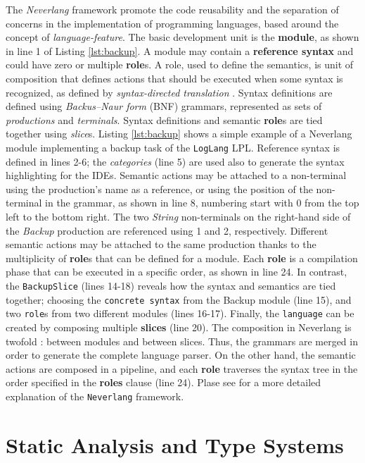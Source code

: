 The \textit{Neverlang} \cite{Cazzola12c, Cazzola13e, Cazzola15c} framework promote the code reusability and the separation of concerns in the implementation of programming languages, based around the concept of \textit{language-feature}.
The basic development unit is the \textbf{module}, as shown in line 1 of Listing \ref{lst:backup}.
A module may contain a \textbf{reference syntax} and could have zero or multiple \textbf{role}s. A role, used to define the semantics, is unit of composition that defines actions that should be executed when some syntax is recognized, as defined by \textit{syntax-directed translation} \cite{Aho86}.
Syntax definitions are defined using \textit{Backus–Naur form} (BNF) grammars, represented as sets of \textit{productions} and \textit{terminals}.
Syntax definitions and semantic \textbf{role}s are tied together using \textit{slice}s.
Listing \ref{lst:backup} shows a simple example of a Neverlang module implementing a backup task of the \texttt{LogLang} LPL. Reference syntax is defined in lines 2-6; the \textit{categories} (line 5) are used also to generate the syntax highlighting for the IDEs.
Semantic actions may be attached to a non-terminal using the production's name as a reference, or using the position of the non-terminal in the grammar, as shown in line 8, numbering start with 0 from the top left to the bottom right.
The two \textit{String} non-terminals on the right-hand side of the \textit{Backup} production are referenced using 1 and 2, respectively.
Different semantic actions may be attached to the same production thanks to the multiplicity of \textbf{role}s that can be defined for a module. Each \textbf{role} is a compilation phase that can be executed in a specific order, as shown in line 24.
In contrast, the \texttt{BackupSlice} (lines 14-18) reveals how the syntax and semantics are tied together; choosing the \texttt{concrete syntax} from the Backup module (line 15), and two \texttt{role}s from two different modules (lines 16-17).
Finally, the \texttt{language} can be created by composing multiple \textbf{slices} (line 20).
The composition in Neverlang is twofold \cite{Cazzola20}: between modules and between slices. Thus, the grammars are merged in order to generate the complete language parser. On the other hand, the semantic actions are composed in a pipeline, and each \textbf{role} traverses the syntax tree in the order specified in the \textbf{roles} clause (line 24).
Plase see \cite{Cazzola15c} for a more detailed explanation of the \texttt{Neverlang} framework.


\section{Static Analysis and Type Systems}\label{sec:background:StaticAnalysisAndTypeSystems}

